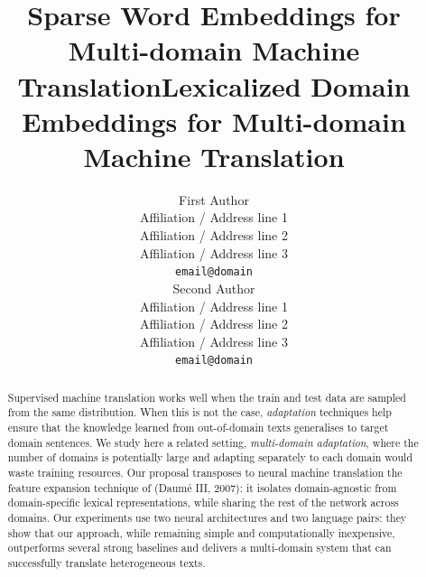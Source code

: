 \documentclass[11pt,a4paper]{article}
\title{Sparse Word Embeddings for Multi-domain Machine Translation}
\title{Lexicalized Domain Embeddings for Multi-domain Machine Translation}
\author{First Author \\%
  Affiliation / Address line 1 \\
  Affiliation / Address line 2 \\
  Affiliation / Address line 3 \\
  {\tt email@domain} \\\And
  Second Author \\
  Affiliation / Address line 1 \\
  Affiliation / Address line 2 \\
  Affiliation / Address line 3 \\
  {\tt email@domain} \\}
\date{}
\newcommand{\fyTodo}[1]{\Todo[FY:]{\textcolor{orange}{#1}}}
\newcommand{\fyDone}[1]{\done[FY]\Todo[FY:]{\textcolor{orange}{#1}}}
\begin{document}
\maketitle

\fyDone{s/naacl/EMNLP/g}
\fyDone{Too long, selfcontained, noref, rewrite}
\begin{abstract}
  Supervised machine translation works well when the train and test data are sampled from the same distribution. 
  When this is not the case, \emph{adaptation} techniques help ensure that the knowledge learned from out-of-domain texts generalises to target domain sentences. 
  We study here a related setting, \emph{multi-domain adaptation}, where the number of domains is potentially large and adapting separately to each domain would waste training resources. 
  Our proposal transposes to neural machine translation the feature expansion technique of (Daum\'e III, 2007): it isolates domain-agnostic from domain-specific lexical representations, while sharing the rest of the network across domains. 
  Our experiments use two neural architectures and two language pairs: they show that our approach, while remaining simple and computationally inexpensive, outperforms several strong baselines and delivers a multi-domain system that can successfully translate heterogeneous texts.

\end{abstract}
\end{document}
